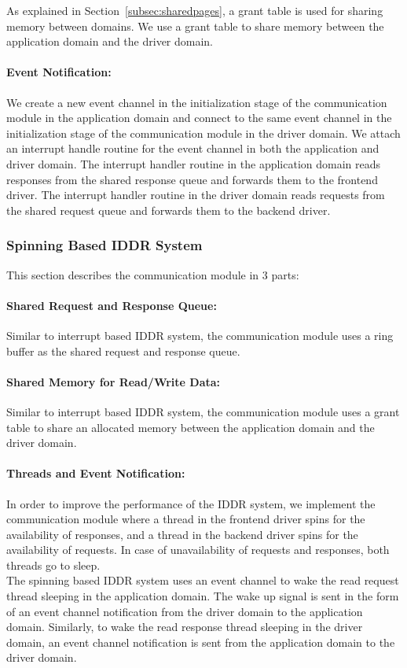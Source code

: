 As explained in Section~\ref{subsec:sharedpages}, a grant table is used for sharing memory between domains. We use a grant table to share memory between the application domain and the driver domain.

\paragraph{Event Notification:}
We create a new event channel in the initialization stage of the communication module in the application domain and connect to the same event channel in the initialization stage of the communication module in the driver domain. We attach an interrupt handle routine for the event channel in both the application and driver domain. The interrupt handler routine in the application domain reads responses from the shared response queue and forwards them to the frontend driver. The interrupt handler routine in the driver domain reads requests from the shared request queue and forwards them to the backend driver.

\subsubsection*{Spinning Based IDDR System}
This section describes the communication module in 3 parts:

\paragraph{Shared Request and Response Queue:}
Similar to interrupt based IDDR system, the communication module uses a ring buffer as the shared request and response queue. 

\paragraph{Shared Memory for Read/Write Data:}
Similar to interrupt based IDDR system, the communication module uses a grant table to share an allocated memory between the application domain and the driver domain. 

\paragraph{Threads and Event Notification:}
In order to improve the performance of the IDDR system, we implement the communication module where a thread in the frontend driver spins for the availability of responses, and a thread in the backend driver spins for the availability of requests. In case of unavailability of requests and responses, both threads go to sleep. 
\\[3mm] 
The spinning based IDDR system uses an event channel to wake the read request thread sleeping in the application domain. The wake up signal is sent in the form of an event channel notification from the driver domain to the application domain. Similarly, to wake the read response thread sleeping in the driver domain, an event channel notification is sent from the application domain to the driver domain.


